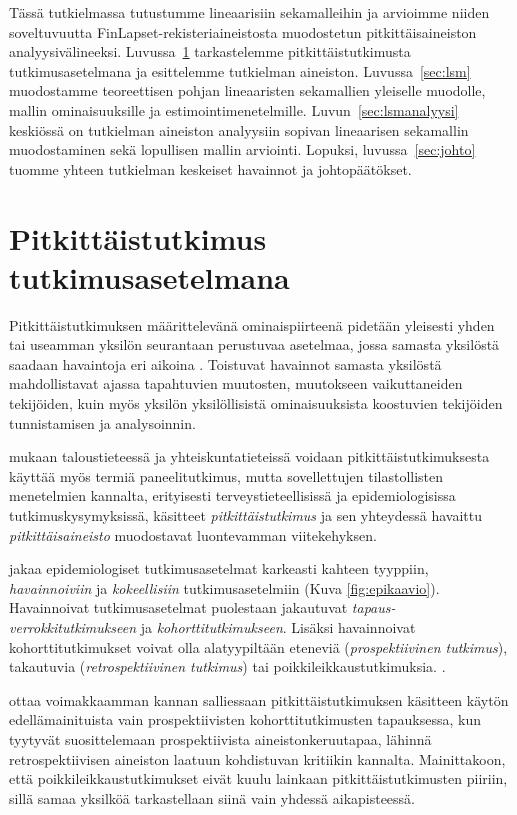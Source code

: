 \documentclass[finnish]{docopts}
\begin{document}
Tässä tutkielmassa tutustumme lineaarisiin sekamalleihin ja arvioimme niiden soveltuvuutta FinLapset-rekisteriaineistosta muodostetun pitkittäisaineiston analyysivälineeksi. Luvussa~\ref{sec:pitkittaistutkimus} tarkastelemme pitkittäistutkimusta tutkimusasetelmana ja esittelemme tutkielman aineiston. Luvussa~\ref{sec:lsm} muodostamme teoreettisen pohjan lineaaristen sekamallien yleiselle muodolle, mallin ominaisuuksille ja estimointimenetelmille. Luvun~\ref{sec:lsmanalyysi} keskiössä on tutkielman aineiston analyysiin sopivan lineaarisen sekamallin muodostaminen sekä lopullisen mallin arviointi. Lopuksi, luvussa~\ref{sec:johto} tuomme yhteen tutkielman keskeiset havainnot ja johtopäätökset.\\

\section{Pitkittäistutkimus tutkimusasetelmana}
\label{sec:pitkittaistutkimus}

Pitkittäistutkimuksen määrittelevänä ominaispiirteenä pidetään yleisesti yhden tai useamman yksilön seurantaan perustuvaa asetelmaa, jossa samasta yksilöstä saadaan havaintoja eri aikoina \citep{diggle13, fitzmaurice11, twisk13, laird82}. Toistuvat havainnot samasta yksilöstä mahdollistavat ajassa tapahtuvien muutosten, muutokseen vaikuttaneiden tekijöiden, kuin myös yksilön yksilöllisistä ominaisuuksista koostuvien tekijöiden tunnistamisen ja analysoinnin.

\cite{diggle13} mukaan taloustieteessä ja yhteiskuntatieteissä voidaan pitkittäistutkimuksesta käyttää myös termiä paneelitutkimus, mutta sovellettujen tilastollisten menetelmien kannalta, erityisesti terveystieteellisissä ja epidemiologisissa tutkimuskysymyksissä, käsitteet \textit{pitkittäistutkimus} ja sen yhteydessä havaittu \textit{pitkittäisaineisto} muodostavat luontevamman viitekehyksen.

\cite{twisk13} jakaa epidemiologiset tutkimusasetelmat karkeasti kahteen tyyppiin, \textit{havainnoiviin} ja \textit{kokeellisiin} tutkimusasetelmiin (Kuva \ref{fig:epikaavio}). Havainnoivat tutkimusasetelmat puolestaan jakautuvat \textit{tapaus-verrokkitutkimukseen} ja \textit{kohorttitutkimukseen}. Lisäksi havainnoivat kohorttitutkimukset voivat olla alatyypiltään eteneviä (\textit{prospektiivinen tutkimus}), takautuvia (\textit{retrospektiivinen tutkimus}) tai poikkileikkaustutkimuksia. \citep{diggle13, twisk13}.

\cite{twisk13} ottaa voimakkaamman kannan salliessaan pitkittäistutkimuksen käsitteen käytön edellämainituista vain prospektiivisten kohorttitutkimusten tapauksessa, kun \cite{diggle13} tyytyvät suosittelemaan prospektiivista aineistonkeruutapaa, lähinnä retrospektiivisen aineiston laatuun kohdistuvan kritiikin kannalta. Mainittakoon, että poikkileikkaustutkimukset eivät kuulu lainkaan pitkittäistutkimusten piiriin, sillä samaa yksilköä tarkastellaan siinä vain yhdessä aikapisteessä.\\
\end{document}
